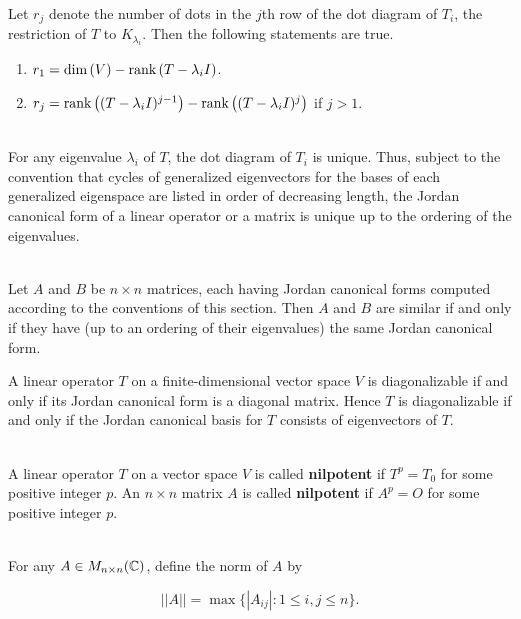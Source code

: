\begin{theorem}
	\hfill\\
	Let $r_j$ denote the number of dots in the $j$th row of the dot diagram of $T_i$, the restriction of $T$ to $K_{\lambda_i}$. Then the following statements are true.

	\begin{enumerate}
		\item $r_1 = \text{dim}\left(V\right) - \text{rank}\left(T - \lambda_i I\right)$.
		\item $r_j = \text{rank}\left((T - \lambda_i I)^{j - 1}\right) - \text{rank}\left((T - \lambda_i I)^j\right)$ if $j > 1$.
	\end{enumerate}
\end{theorem}

\begin{corollary}
	\hfill\\
	For any eigenvalue $\lambda_i$ of $T$, the dot diagram of $T_i$ is unique. Thus, subject to the convention that cycles of generalized eigenvectors for the bases of each generalized eigenspace are listed in order of decreasing length, the Jordan canonical form of a linear operator or a matrix is unique up to the ordering of the eigenvalues.
\end{corollary}

\begin{theorem}
	\hfill\\
	Let $A$ and $B$ be $n \times n$ matrices, each having Jordan canonical forms computed according to the conventions of this section. Then $A$ and $B$ are similar if and only if they have (up to an ordering of their eigenvalues) the same Jordan canonical form.
\end{theorem}

\begin{lemma}
	A linear operator $T$ on a finite-dimensional vector space $V$ is diagonalizable if and only if its Jordan canonical form is a diagonal matrix. Hence $T$ is diagonalizable if and only if the Jordan canonical basis for $T$ consists of eigenvectors of $T$.
\end{lemma}

\begin{definition}
	\hfill\\
	A linear operator $T$ on a vector space $V$ is called \textbf{nilpotent} if $T^p = T_0$ for some positive integer $p$. An $n \times n$ matrix $A$ is called \textbf{nilpotent} if $A^p = O$ for some positive integer $p$.
\end{definition}

\begin{definition}
	\hfill\\
	For any $A \in M_{n \times n}(\mathbb{C})$, define the norm of $A$ by

	\[||A|| = \max \{|A_{ij}| : 1 \leq i, j \leq n\}.\]
\end{definition}
